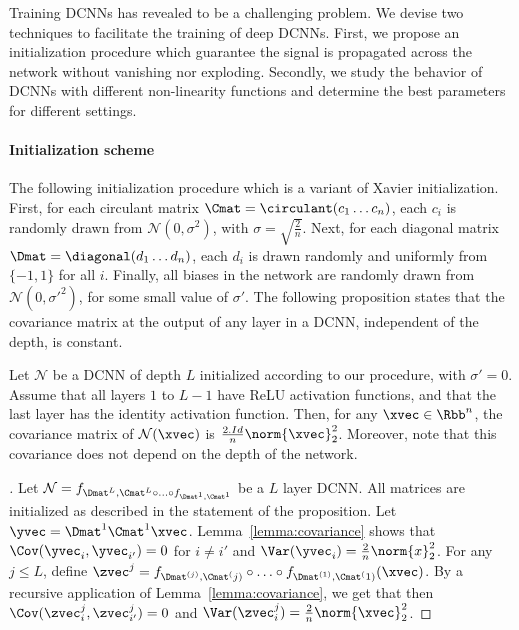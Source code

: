 Training DCNNs has revealed to be a challenging problem.
We devise two techniques to facilitate the training of deep DCNNs.
First, we propose an initialization procedure which guarantee the signal is propagated across the network without vanishing nor exploding.
Secondly, we study the behavior of DCNNs with different non-linearity functions and determine the best parameters for different settings. 

\paragraph{Initialization scheme}
The following initialization procedure which is a variant of Xavier initialization.
First, for each circulant matrix $\Cmat = \circulant (c_{1} \ldots c_{n})$, each $c_{i}$ is randomly drawn from $\mathcal{N} \left(0,\sigma^{2}\right)$, with $\sigma=\sqrt{\frac{2}{n}}$.
Next, for each diagonal matrix $\Dmat = \diagonal (d_{1} \ldots d_{n})$, each $d_{i}$ is drawn randomly and uniformly from $\{-1,1\}$ for all $i$.
Finally, all biases in the network are randomly drawn from $\mathcal{N}\left(0,\sigma'^{2}\right)$, for some small value of $\sigma'$.
The following proposition states that the covariance matrix at the output of any layer in a DCNN, independent of the depth, is constant.

\begin{proposition} \label{proposition:initialization}
Let $\mathcal{N}$ be a DCNN of depth $L$ initialized according to our procedure, with $\sigma'=0$.
Assume that all layers $1$ to $L-1$ have ReLU activation functions, and that the last layer has the identity activation function.
Then, for any $\xvec \in \Rbb^{n}$, the covariance matrix of $\mathcal{N}(\xvec)$ is $\frac{2.Id}{n}\norm{\xvec}_{2}^{2}$.
Moreover, note that this covariance does not depend on the depth of the network.
\end{proposition}

\begin{proof}[]
Let $\mathcal{N} = f_{\Dmat^{L}, \Cmat^{L} \circ \ldots \circ f_{\Dmat^{1}, \Cmat^{1}}}$ be a $L$ layer DCNN.
All matrices are initialized as described in the statement of the proposition.
Let $\yvec = \Dmat^{1} \Cmat^{1} \xvec$.
Lemma~\ref{lemma:covariance} shows that $\Cov(\yvec_{i}, \yvec_{i'}) = 0$ for $i \neq i'$ and $\Var(\yvec_{i}) = \frac{2}{n}\norm{x}_{2}^{2}$.
For any $j \le L$, define $\zvec^j = f_{\Dmat^{(j)}, \Cmat^(j)} \circ \ldots \circ f_{\Dmat^{(1)}, \Cmat^(1)}(\xvec)$.
By a recursive application of Lemma~\ref{lemma:covariance}, we get that then $\Cov(\zvec_i^j, \zvec_{i'}^j) = 0$ and $\Var(\zvec_i^j) = \frac{2}{n} \norm{\xvec}_2^2$.
\end{proof}

